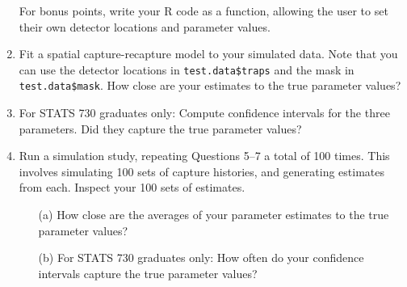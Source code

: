 \documentclass{article}
\begin{document}
\begin{enumerate}
  For bonus points, write your R code as a function, allowing the user
  to set their own detector locations and parameter values.

\item Fit a spatial capture-recapture model to your simulated
  data. Note that you can use the detector locations in
  \texttt{test.data\$traps} and the mask in
  \texttt{test.data\$mask}. How close are your estimates to the true
  parameter values?

\item For STATS 730 graduates only: Compute confidence intervals for
  the three parameters. Did they capture the true parameter values?

\item Run a simulation study, repeating Questions 5--7 a total of 100
  times. This involves simulating 100 sets of capture histories, and
  generating estimates from each. Inspect your 100 sets of estimates.
  \begin{enumerate}
  \item[(a)] How close are the averages of your parameter estimates to
    the true parameter values?
  \item[(b)] For STATS 730 graduates only: How often do your confidence
    intervals capture the true parameter values?
  \end{enumerate}
  
\end{enumerate}


\end{document}
